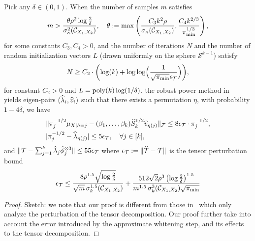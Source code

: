 \documentclass{article}
\begin{document}
\begin{theorem} \label{thm:samplebound}
\vspace{-3mm}
Pick  any $\delta\in (0,1)$. When the number of samples $m$ satisfies
\[ m >\frac{\theta\rho^2  \log\frac{2}{\delta}}{\sigma^2_\kappa(\Ccal_{X_1, X_2})},
\quad \theta:= \max\left(\frac{C_3 k^2 \rho}{\sigma_\kappa( \Ccal_{X_1, X_2})}, \frac{C_4k^{2/3}\iffalse(1+\sigma_{k+1}(\Ccal_{X_1, X_2}))^2 \fi }{\pi_{\min}^{1/3}}\right),\] for some constants $C_3, C_4>0$, and the number of iterations $N$  and  the number of random initialization vectors $L$  (drawn uniformly on the sphere $\mathcal{S}^{k-1}$)  satisfy
\begin{align*}
  N \geq C_2 \cdot \biggl( \log(k) + \log\log\Bigl(
 \frac{1}{\sqrt{\pi_{\min}}\epsilon_{{\mathcal{T}}}} \Bigr) \biggr),
\end{align*}
for constant $C_2>0$ and  $L = \operatorname{poly}(k) \log(1/\delta)$,  the robust power method in~\cite{AnandkumarEtal:tensor12} yields eigen-pairs $(\widehat{\lambda}_i, \widehat{v}_i)$ such that there exists a permutation $\eta$, with probability $1-4\delta$, we have
\begin{align*}
&\|\pi^{-1/2}_{j} \mu_{X|h=j}-(\beta_1,\ldots,\beta_k) \widehat  S_k^{1/2}\widehat{v}_{\eta(j)}\|_{\mathcal{F}} \leq 8 \epsilon_{{\mathcal{T}}} \cdot\pi^{-1/2}_{j}
, \\
&|\pi^{-1/2}_{j}-\widehat{\lambda}_{\eta(j)}| \leq  5\epsilon_{{\mathcal{T}}}, \quad \forall j \in [k],
\end{align*}
and $\|{\mathcal{T}} - \sum\nolimits_{j=1}^k \hat\lambda_j \hat{\phi}_j^{\otimes 3} \| \leq 55\epsilon_{{\mathcal{T}}}$ where $\epsilon_{{\mathcal{T}}}:= \|\widehat{{\mathcal{T}}} - {\mathcal{T}}\|$ is the tensor perturbation bound
\begin{align*} \epsilon_{{\mathcal{T}}} \leq
\frac{8 \rho^{1.5} \sqrt{\log\frac{2}{\delta}}}{\sqrt{m} \, \sigma_k^{1.5}(\mathcal{C}_{X_1, X_2})} + \frac{512 \sqrt{2} \rho^3 \left(\log\frac{2}{\delta}\right)^{1.5}}{m^{1.5} \,\sigma_k^{3}(\mathcal{C}_{X_1, X_2}) \sqrt{\pi_{\min}}}
\end{align*}
\vspace{-3mm}
\end{theorem}

\begin{proof}
Sketch: we note that our proof is different from those in~\citet{AnandkumarEtal:tensor12} which only analyze the perturbation of the tensor decomposition. Our proof further take into account the error introduced by the approximate whitening step, and its effects to the tensor decomposition.
\vspace{-4mm}
\end{proof}
\end{document}
